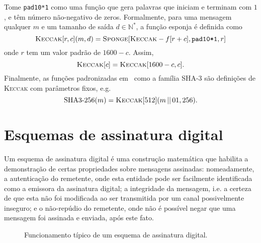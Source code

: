 \documentclass[12pt]{report}
\newcommand{\pk}{\mathcal{P}_k}
\newcommand{\sk}{\mathcal{S}_k}
\newcommand{\concat}{\, \vert \vert \,}
\newcommand{\binwds}[1]{\{0, 1\}^{#1}}
\begin{document}
Tome \texttt{pad10*1} como uma função que gera palavras que iniciam e terminam
com $1$, e têm número não-negativo de zeros. Formalmente, para uma mensagem
qualquer $m$ e um tamanho de saída $d \in \mathbb{N}^{*}$, a função esponja é
definida como
\begin{equation}
  \textsc{Keccak}[r, c](m, d)
    = \textsc{Sponge}[\textsc{Keccak}-f[r + c], \texttt{pad10*1}, r]
\end{equation}
onde $r$ tem um valor padrão de $1600 - c$. Assim,
\begin{equation}
  \textsc{Keccak}[c] = \textsc{Keccak}[1600 - c, c].
\end{equation}
Finalmente, as funções padronizadas em~\cite{Dworkin2015} como a família SHA-3
são definições de \textsc{Keccak} com parâmetros fixos, e.g.
\begin{equation}
  \text{SHA3-}256(m) = \textsc{Keccak}[512](m \concat 01, 256).
\end{equation}

\section{Esquemas de assinatura digital}

Um esquema de assinatura digital é uma construção matemática que habilita a
demonstração de certas propriedades sobre mensagens assinadas: nomeadamente, a
autenticação do remetente, onde esta entidade pode ser facilmente identificada
como a emissora da assinatura digital; a integridade da mensagem, i.e. a
certeza de que esta não foi modificada ao ser transmitida por um canal
possivelmente inseguro; e o não-repúdio do remetente, onde não é possível negar
que uma mensagem foi assinada e enviada, após este fato.

\begin{figure}[ht]
  \centering
  \caption{Funcionamento típico de um esquema de assinatura digital.}
  \label{fig:2}
\end{figure}
\end{document}
